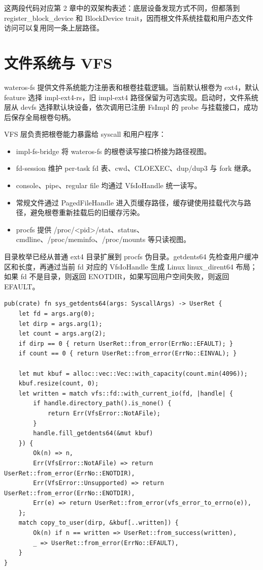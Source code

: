 \documentclass[12pt,openany,oneside,AutoFakeBold=true]{ctexbook}
\newcommand{\code}[1]{\textnormal{\rmfamily #1}}
\newcommand{\syscall}[1]{\textnormal{\rmfamily #1}}
\begin{document}
这两段代码对应第 2 章中的双架构表述：底层设备发现方式不同，但都落到 \code{register\_block\_device} 和 \code{BlockDevice} trait，因而根文件系统挂载和用户态文件访问可以复用同一条上层路径。

\section{文件系统与 VFS}

\code{wateros-fs} 提供文件系统能力注册表和根卷挂载逻辑。当前默认根卷为 ext4，默认 feature 选择 \code{impl-ext4-rs}，旧 \code{impl-ext4} 路径保留为可选实现。启动时，文件系统层从 devfs 选择默认块设备，依次调用已注册 \code{FsImpl} 的 \code{probe} 与挂载接口，成功后保存全局根卷句柄。

VFS 层负责把根卷能力暴露给 syscall 和用户程序：

\begin{itemize}
  \item \code{impl-fs-bridge} 将 \code{wateros-fs} 的根卷读写接口桥接为路径视图。
  \item \code{fd-session} 维护 per-task fd 表、cwd、CLOEXEC、dup/dup3 与 fork 继承。
  \item console、pipe、regular file 均通过 \code{VfsIoHandle} 统一读写。
  \item 常规文件通过 \code{PagedFileHandle} 进入页缓存路径，缓存键使用挂载代次与路径，避免根卷重新挂载后的旧缓存污染。
  \item procfs 提供 \code{/proc/<pid>/stat}、\code{status}、\code{cmdline}、\code{/proc/meminfo}、\code{/proc/mounts} 等只读视图。
\end{itemize}

目录枚举已经从普通 ext4 目录扩展到 procfs 伪目录。\syscall{getdents64} 先检查用户缓冲区和长度，再通过当前 fd 对应的 \code{VfsIoHandle} 生成 Linux \code{linux\_dirent64} 布局；如果 fd 不是目录，则返回 \code{ENOTDIR}，如果写回用户空间失败，则返回 \code{EFAULT}。

\begin{lstlisting}
pub(crate) fn sys_getdents64(args: SyscallArgs) -> UserRet {
    let fd = args.arg(0);
    let dirp = args.arg(1);
    let count = args.arg(2);
    if dirp == 0 { return UserRet::from_error(ErrNo::EFAULT); }
    if count == 0 { return UserRet::from_error(ErrNo::EINVAL); }

    let mut kbuf = alloc::vec::Vec::with_capacity(count.min(4096));
    kbuf.resize(count, 0);
    let written = match vfs::fd::with_current_io(fd, |handle| {
        if handle.directory_path().is_none() {
            return Err(VfsError::NotAFile);
        }
        handle.fill_getdents64(&mut kbuf)
    }) {
        Ok(n) => n,
        Err(VfsError::NotAFile) => return UserRet::from_error(ErrNo::ENOTDIR),
        Err(VfsError::Unsupported) => return UserRet::from_error(ErrNo::ENOTDIR),
        Err(e) => return UserRet::from_error(vfs_error_to_errno(e)),
    };
    match copy_to_user(dirp, &kbuf[..written]) {
        Ok(n) if n == written => UserRet::from_success(written),
        _ => UserRet::from_error(ErrNo::EFAULT),
    }
}
\end{lstlisting}
\end{document}
